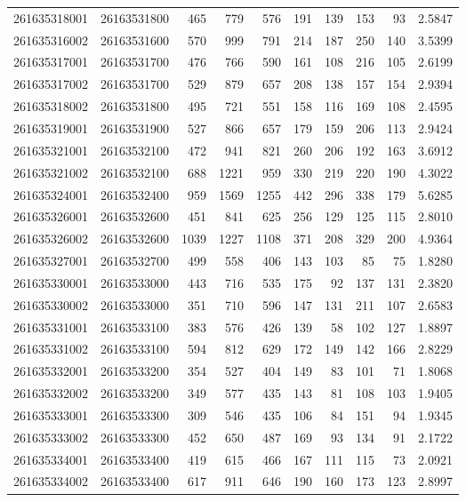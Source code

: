 \documentclass[
  11pt,
]{article}
\begin{document}
\begin{longtable}[t]{llrrrrrrrr}
261635318001 & 26163531800 & 465 & 779 & 576 & 191 & 139 & 153 & 93 & 2.5847\\
261635316002 & 26163531600 & 570 & 999 & 791 & 214 & 187 & 250 & 140 & 3.5399\\
261635317001 & 26163531700 & 476 & 766 & 590 & 161 & 108 & 216 & 105 & 2.6199\\
261635317002 & 26163531700 & 529 & 879 & 657 & 208 & 138 & 157 & 154 & 2.9394\\
261635318002 & 26163531800 & 495 & 721 & 551 & 158 & 116 & 169 & 108 & 2.4595\\
261635319001 & 26163531900 & 527 & 866 & 657 & 179 & 159 & 206 & 113 & 2.9424\\
261635321001 & 26163532100 & 472 & 941 & 821 & 260 & 206 & 192 & 163 & 3.6912\\
261635321002 & 26163532100 & 688 & 1221 & 959 & 330 & 219 & 220 & 190 & 4.3022\\
261635324001 & 26163532400 & 959 & 1569 & 1255 & 442 & 296 & 338 & 179 & 5.6285\\
261635326001 & 26163532600 & 451 & 841 & 625 & 256 & 129 & 125 & 115 & 2.8010\\
261635326002 & 26163532600 & 1039 & 1227 & 1108 & 371 & 208 & 329 & 200 & 4.9364\\
261635327001 & 26163532700 & 499 & 558 & 406 & 143 & 103 & 85 & 75 & 1.8280\\
261635330001 & 26163533000 & 443 & 716 & 535 & 175 & 92 & 137 & 131 & 2.3820\\
261635330002 & 26163533000 & 351 & 710 & 596 & 147 & 131 & 211 & 107 & 2.6583\\
261635331001 & 26163533100 & 383 & 576 & 426 & 139 & 58 & 102 & 127 & 1.8897\\
261635331002 & 26163533100 & 594 & 812 & 629 & 172 & 149 & 142 & 166 & 2.8229\\
261635332001 & 26163533200 & 354 & 527 & 404 & 149 & 83 & 101 & 71 & 1.8068\\
261635332002 & 26163533200 & 349 & 577 & 435 & 143 & 81 & 108 & 103 & 1.9405\\
261635333001 & 26163533300 & 309 & 546 & 435 & 106 & 84 & 151 & 94 & 1.9345\\
261635333002 & 26163533300 & 452 & 650 & 487 & 169 & 93 & 134 & 91 & 2.1722\\
261635334001 & 26163533400 & 419 & 615 & 466 & 167 & 111 & 115 & 73 & 2.0921\\
261635334002 & 26163533400 & 617 & 911 & 646 & 190 & 160 & 173 & 123 & 2.8997\\

\end{longtable}
\end{document}
